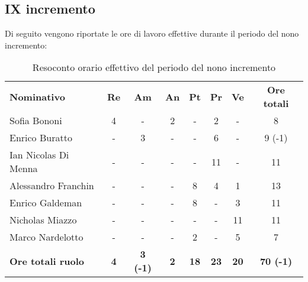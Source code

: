 \documentclass[../piano-di-progetto.tex]{subfiles}
\begin{document}
\subsection{IX incremento}

Di seguito vengono riportate le ore di lavoro effettive durante il periodo del nono incremento:
\begin{table}[H]
    \centering
    \begin{tabular}{lccccccc}
      \rowcolor{lightgray}
      \textbf{Nominativo}       & \textbf{Re}      & \textbf{Am} & \textbf{An}      & \textbf{Pt} & \textbf{Pr} & \textbf{Ve} & \textbf{Ore totali} \\
Sofia Bononi              & 4          & -                & 2          & -           & 2           & -           & 8                \\
Enrico Buratto            & -          & 3                & -          & -           & 6           & -           & 9 (-1)           \\
Ian Nicolas Di Menna      & -          & -                & -          & -           & 11          & -           & 11               \\
Alessandro Franchin       & -          & -                & -          & 8           & 4           & 1           & 13               \\
Enrico Galdeman           & -          & -                & -          & 8           & -           & 3           & 11               \\
Nicholas Miazzo           & -          & -                & -          & -           & -           & 11          & 11               \\
Marco Nardelotto          & -          & -                & -          & 2           & -           & 5           & 7                \\
\textbf{Ore totali ruolo} & \textbf{4} & \textbf{3  (-1)} & \textbf{2} & \textbf{18} & \textbf{23} & \textbf{20} & \textbf{70 (-1)}

    \end{tabular}
    \caption{Resoconto orario effettivo del periodo del nono incremento}
  \end{table}
\end{document}
